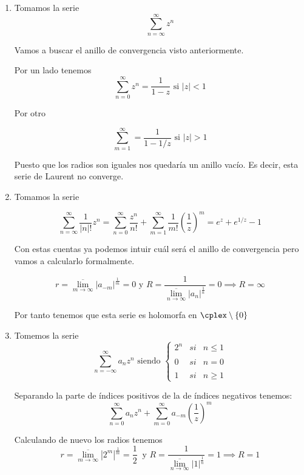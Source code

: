 \documentclass{apuntes}
\begin{document}
\begin{example}

\begin{enumerate}
\item Tomamos la serie
\[\sum_{n=\infty}^{\infty}z^n\]

Vamos a buscar el anillo de convergencia visto anteriormente.

Por un lado tenemos
\[\sum_{n=0}^{\infty}z^n = \frac{1}{1-z} \text{ si } |z| < 1\]

Por otro

\[\sum_{m=1}^{\infty}=\frac{1}{1-1/z} \text{ si } |z|>1\]

Puesto que los radios son iguales nos quedaría un anillo vacío. Es decir, esta serie de Laurent no converge.

\item Tomamos la serie

\[\sum_{n=\infty}^{\infty}\frac{1}{|n|!}z^n = \sum_{n=0}^{\infty}\frac{z^n}{n!} + \sum_{m=1}^{\infty}\frac{1}{m!}\left(\frac{1}{z}\right)^m = e^z +e^{1/z}-1\]

Con estas cuentas ya podemos intuir cuál será el anillo de convergencia pero vamos a calcularlo formalmente.

\[r = \overline{\lim_{m \to \infty}}|a_{-m}|^\frac{1}{m}=0 \text{ y } R = \frac{1}{\overline{\lim_{n \to \infty}}|a_{n}|^\frac{1}{n}}=0 \implies R = \infty\]

Por tanto tenemos que esta serie es holomorfa en $\cplex \setminus \{0\}$

\item Tomemos la serie
\[\sum_{n=-\infty}^{\infty}a_nz^n \text{ siendo } \left\{ \begin{array}{lcc}
             2^n &   si  & n \leq 1 \\
             \\ 0 &  si & n=0 \\
             \\ 1 &  si  & n \geq 1
             \end{array}
   \right.\]

Separando la parte de índices positivos de la de índices negativos tenemos:
\[\sum_{n=0}^{\infty}a_nz^n + \sum_{m=0}^{\infty}a_{-m}\left(\frac{1}{z}\right)^m\]

Calculando de nuevo los radios tenemos
\[r = \overline{\lim_{m \to \infty}}|2^m|^\frac{1}{m}=\frac{1}{2} \ \text{ y } R = \frac{1}{\overline{\lim_{n \to \infty}}|1|^\frac{1}{n}}=1 \implies R = 1\]

\end{enumerate}
\end{example}
\end{document}
